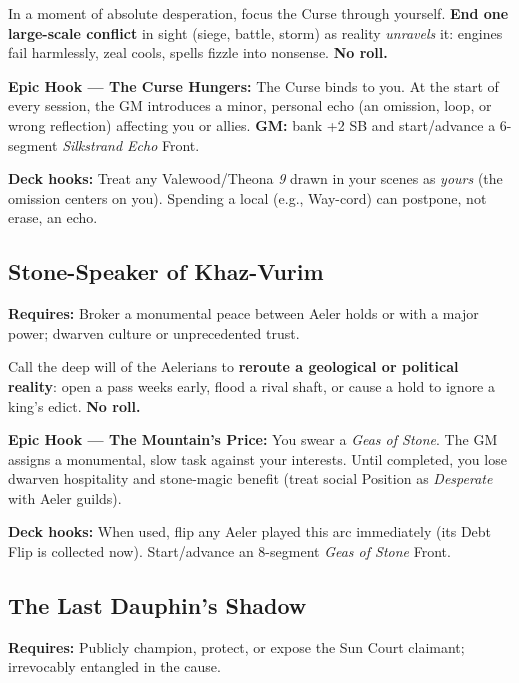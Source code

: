 \begin{tcolorbox}[enhanced,sharp corners,boxrule=.6pt,title={Talent — Laughter That Ends Sieges (20 XP, 1/campaign)}]
In a moment of absolute desperation, focus the Curse through yourself. \textbf{End one large-scale conflict} in sight (siege, battle, storm) as reality \emph{unravels} it: engines fail harmlessly, zeal cools, spells fizzle into nonsense. \textbf{No roll.}
\end{tcolorbox}

\textbf{Epic Hook — The Curse Hungers:} The Curse binds to you. At the start of every session, the GM introduces a minor, personal echo (an omission, loop, or wrong reflection) affecting you or allies. \textbf{GM:} bank +2 SB and start/advance a 6-segment \emph{Silkstrand Echo} Front.

\textbf{Deck hooks:} Treat any Valewood/Theona \emph{9} drawn in your scenes as \emph{yours} (the omission centers on you). Spending a local \SuitDiamond{} (e.g., Way-cord) can postpone, not erase, an echo.

\subsection{Stone-Speaker of Khaz-Vurim}
\textbf{Requires:} Broker a monumental peace between Aeler holds or with a major power; dwarven culture or unprecedented trust.

\begin{tcolorbox}[enhanced,sharp corners,boxrule=.6pt,title={Talent — Move the Mountain's Will (20 XP, 1/campaign)}]
Call the deep will of the Aelerians to \textbf{reroute a geological or political reality}: open a pass weeks early, flood a rival shaft, or cause a hold to ignore a king's edict. \textbf{No roll.}
\end{tcolorbox}

\textbf{Epic Hook — The Mountain's Price:} You swear a \emph{Geas of Stone}. The GM assigns a monumental, slow task against your interests. Until completed, you lose dwarven hospitality and stone-magic benefit (treat social Position as \emph{Desperate} with Aeler guilds).

\textbf{Deck hooks:} When used, flip any Aeler \SuitDiamond{} played this arc immediately (its Debt Flip is collected now). Start/advance an 8-segment \emph{Geas of Stone} Front.

\subsection{The Last Dauphin's Shadow}
\textbf{Requires:} Publicly champion, protect, or expose the Sun Court claimant; irrevocably entangled in the cause.


